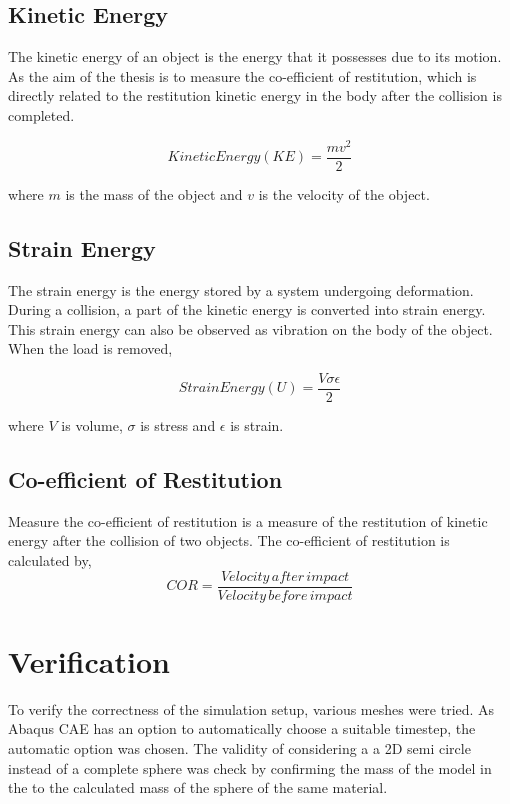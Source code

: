 \subsection{Kinetic Energy}

The kinetic energy of an object is the energy that it possesses due to its motion. As the aim of the thesis is to measure the co-efficient of restitution, which is directly related to the restitution kinetic energy in the body after the collision is completed.

\begin{equation}
Kinetic Energy(KE) = \frac{mv^{2}}{2}
\end{equation}
 
 where $m$ is the mass of the object and $v$ is the velocity of the object.

\subsection{Strain Energy}

The strain energy is the energy stored by a system undergoing deformation. During a collision, a part of the kinetic energy is converted into strain energy. This strain energy can also be observed as vibration on the body of the object. When the load is removed,

\begin{equation}
Strain Energy(U) = \frac{V\sigma\epsilon}{2}
\end{equation}

where $V$ is volume, $\sigma$ is stress and $\epsilon$ is strain.

\subsection{Co-efficient of Restitution}

Measure the co-efficient of restitution is a measure of the restitution of kinetic energy after the collision of two objects. 
The co-efficient of restitution is calculated by,
\begin{equation}
COR = \frac{Velocity\, after\, impact}{Velocity\, before\, impact}
\end{equation}
\section{Verification}

To verify the correctness of the simulation setup, various meshes were tried. 
As Abaqus CAE has an option to automatically choose a suitable timestep, the automatic option was chosen.
The validity of considering a a 2D semi circle instead of a complete sphere was check by confirming the mass of the model in the to the calculated mass of the sphere of the same material.